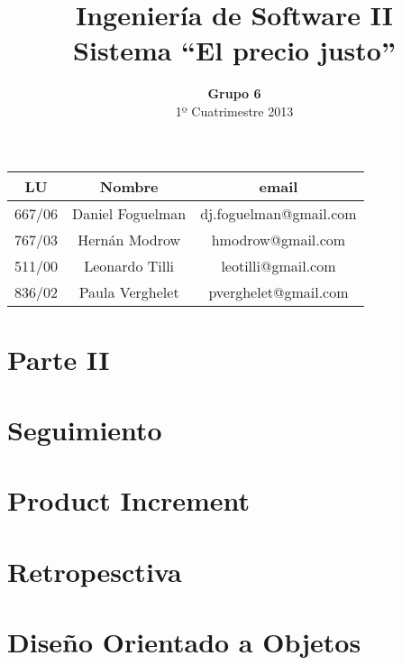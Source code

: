 \documentclass[a4paper,8pt]{article}
\title{Ingeniería de Software II\\ \textbf{Sistema ``El precio justo''}}
\author{\textbf{Grupo 6}\\ 1º Cuatrimestre 2013}
\date{}
\begin{document}
\maketitle
\vspace{10cm}
\begin{center}

\begin{tabular}{|c|c|c|}
\hline
\hline
\textbf{LU}&\textbf{Nombre}&\textbf{email}\\
\hline
667/06&Daniel Foguelman &dj.foguelman@gmail.com\\
\hline
767/03&Hernán Modrow&hmodrow@gmail.com\\
\hline
511/00&Leonardo Tilli&leotilli@gmail.com\\
\hline
836/02&Paula Verghelet&pverghelet@gmail.com\\
\hline
\hline
\end{tabular}
\end{center}
\newpage

\section{Parte II}

\section{Seguimiento}



\section{Product Increment}



\section{Retropesctiva}



\section{Diseño Orientado a Objetos}


\end{document}
